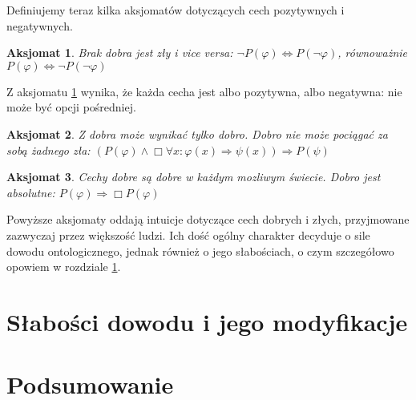\documentclass{article}
\newtheorem{axiom-g}{Aksjomat}
\begin{document}
Definiujemy teraz kilka aksjomatów dotyczących cech pozytywnych i negatywnych. 
\begin{axiom-g} \label{axiom:1}
	Brak dobra jest zły i vice versa: $\neg P(\varphi) \Leftrightarrow P(\neg \varphi)$, równoważnie $P(\varphi) \Leftrightarrow \neg P(\neg \varphi)$
\end{axiom-g}
Z aksjomatu \ref{axiom:1} wynika, że każda cecha jest albo pozytywna, albo negatywna: nie może być opcji pośredniej. 
\begin{axiom-g}
	Z dobra może wynikać tylko dobro. Dobro nie może pociągać za sobą żadnego zła: $\left( P(\varphi) \wedge \Box \forall x: \varphi(x) \Rightarrow \psi(x) \right) \Rightarrow P(\psi)$
\end{axiom-g}
\begin{axiom-g}
	Cechy dobre są dobre w każdym mozliwym świecie. Dobro jest absolutne: $P(\varphi) \Rightarrow \Box P(\varphi)$
\end{axiom-g}
Powyższe aksjomaty oddają intuicje dotyczące cech dobrych i złych, przyjmowane zazwyczaj przez większość ludzi. Ich dość ogólny charakter decyduje o sile dowodu ontologicznego, jednak również o jego słabościach, o czym szczegółowo opowiem w rozdziale \ref{sec:anderson-proof}. 





\section{Słabości dowodu i jego modyfikacje} \label{sec:anderson-proof}

\section{Podsumowanie}
\end{document}
